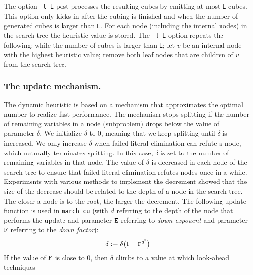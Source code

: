 \documentclass{llncs}
\begin{document}

The option {\tt -l L} post-processes the resulting cubes by emitting at most {\tt L} cubes. This option only kicks in after the cubing
is finished and when the number of generated cubes is larger than {\tt L}. For each node (including the internal nodes) in the
search-tree the heuristic value is stored. The {\tt -l L} option repeats the following: while the number of cubes is larger than {\tt L};
let $v$ be an internal node with the highest heuristic value; remove both leaf nodes that are children of $v$ from the search-tree.


\subsubsection{The update mechanism.}
The dynamic heuristic is based on a mechanism that approximates the optimal number to realize fast performance.
The mechanism stops splitting if the number of remaining variables in a node (subproblem) drops below the value of parameter $\delta$. 
We initialize $\delta$ to $0$, meaning that we keep splitting until $\delta$ is increased. We only increase $\delta$ when failed literal elimination
can refute a node, which naturally terminates splitting. In this case, $\delta$ is set to the number of remaining variables in that node.
%
The value of $\delta$ is decreased in each node of the search-tree to ensure that  failed literal elimination
refutes nodes once in a while. Experiments with various 
methods to implement the decrement showed  that the size of the decrease should 
be related to the depth of a node in the search-tree. The closer a node is to the root, the larger the decrement.
The following update function is used in {\tt march\_cu} (with $d$ referring to the depth of the node that performs the update and 
parameter ${\tt E}$ referring to  {\em down exponent} and parameter ${\tt F}$ referring to the {\em down factor}): 
%
\[
\delta := \delta \big(1 - {\tt F}^{d^{\tt E}}\big)
\]
%
If the value of ${\tt F}$ is close to $0$, then $\delta$ climbs to a value at which look-ahead techniques 
\end{document}
